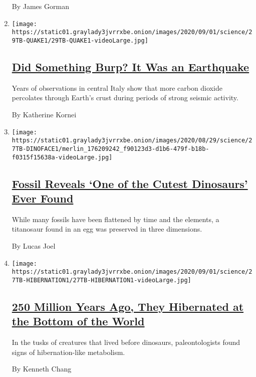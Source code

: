 \begin{enumerate}
  By James Gorman
\item
  \texttt{[image: https://static01.graylady3jvrrxbe.onion/images/2020/09/01/science/29TB-QUAKE1/29TB-QUAKE1-videoLarge.jpg]}

  \hypertarget{did-something-burp-it-was-an-earthquake}{%
  \subsection{\texorpdfstring{\href{/2020/08/29/science/earthquakes-carbon-dioxide.html}{Did
  Something Burp? It Was an
  Earthquake}}{Did Something Burp? It Was an Earthquake}}\label{did-something-burp-it-was-an-earthquake}}

  Years of observations in central Italy show that more carbon dioxide
  percolates through Earth's crust during periods of strong seismic
  activity.

  By Katherine Kornei
\item
  \texttt{[image: https://static01.graylady3jvrrxbe.onion/images/2020/08/29/science/27TB-DINOFACE1/merlin\_176209242\_f90123d3-d1b6-479f-b18b-f0315f15638a-videoLarge.jpg]}

  \hypertarget{fossil-reveals-one-of-the-cutest-dinosaurs-ever-found}{%
  \subsection{\texorpdfstring{\href{/2020/08/27/science/dinosaur-face-fossil.html}{Fossil
  Reveals `One of the Cutest Dinosaurs' Ever
  Found}}{Fossil Reveals `One of the Cutest Dinosaurs' Ever Found}}\label{fossil-reveals-one-of-the-cutest-dinosaurs-ever-found}}

  While many fossils have been flattened by time and the elements, a
  titanosaur found in an egg was preserved in three dimensions.

  By Lucas Joel
\item
  \texttt{[image: https://static01.graylady3jvrrxbe.onion/images/2020/09/01/science/27TB-HIBERNATION1/27TB-HIBERNATION1-videoLarge.jpg]}

  \hypertarget{250-million-years-ago-they-hibernated-at-the-bottom-of-the-world}{%
  \subsection{\texorpdfstring{\href{/2020/08/27/science/fossil-hibernation.html}{250
  Million Years Ago, They Hibernated at the Bottom of the
  World}}{250 Million Years Ago, They Hibernated at the Bottom of the World}}\label{250-million-years-ago-they-hibernated-at-the-bottom-of-the-world}}

  In the tusks of creatures that lived before dinosaurs, paleontologists
  found signs of hibernation-like metabolism.

  By Kenneth Chang
\end{enumerate}

